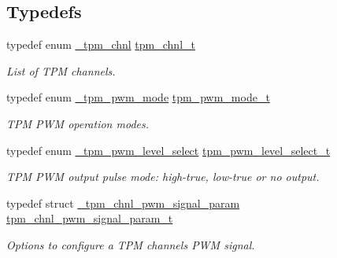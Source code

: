 \subsection*{Typedefs}
\begin{DoxyCompactItemize}
\item 
typedef enum \mbox{\hyperlink{group__tpm_gacc39a4172737e2409c9b198604b1b4a4}{\+\_\+tpm\+\_\+chnl}} \mbox{\hyperlink{group__tpm_gacda6962369e014c8ac72d1b58b224deb}{tpm\+\_\+chnl\+\_\+t}}
\begin{DoxyCompactList}\small\item\em List of T\+PM channels. \end{DoxyCompactList}\item 
\mbox{\label{group__tpm_ga3575f319c9fbc1aa574a1054c14e7dab}} 
typedef enum \mbox{\hyperlink{group__tpm_gad7846db814bfb6055814736b8325b668}{\+\_\+tpm\+\_\+pwm\+\_\+mode}} \mbox{\hyperlink{group__tpm_ga3575f319c9fbc1aa574a1054c14e7dab}{tpm\+\_\+pwm\+\_\+mode\+\_\+t}}
\begin{DoxyCompactList}\small\item\em T\+PM P\+WM operation modes. \end{DoxyCompactList}\item 
\mbox{\label{group__tpm_gaa50bc4e977e2e6e8abcbfc39d79f0674}} 
typedef enum \mbox{\hyperlink{group__tpm_ga1efad91e0bd88db60f58667c720d472c}{\+\_\+tpm\+\_\+pwm\+\_\+level\+\_\+select}} \mbox{\hyperlink{group__tpm_gaa50bc4e977e2e6e8abcbfc39d79f0674}{tpm\+\_\+pwm\+\_\+level\+\_\+select\+\_\+t}}
\begin{DoxyCompactList}\small\item\em T\+PM P\+WM output pulse mode\+: high-\/true, low-\/true or no output. \end{DoxyCompactList}\item 
\mbox{\label{group__tpm_ga19383e0a3baf4033a37e96df9016ab1c}} 
typedef struct \mbox{\hyperlink{struct__tpm__chnl__pwm__signal__param}{\+\_\+tpm\+\_\+chnl\+\_\+pwm\+\_\+signal\+\_\+param}} \mbox{\hyperlink{group__tpm_ga19383e0a3baf4033a37e96df9016ab1c}{tpm\+\_\+chnl\+\_\+pwm\+\_\+signal\+\_\+param\+\_\+t}}
\begin{DoxyCompactList}\small\item\em Options to configure a T\+PM channel\textquotesingle{}s P\+WM signal. \end{DoxyCompactList}\item 

\end{DoxyCompactItemize}
